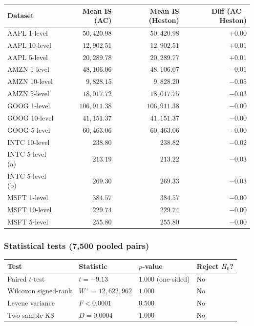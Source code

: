 \documentclass[11pt]{article}
\begin{document}
\begin{center}
\small
\begin{tabular}{lrrr}
\toprule
Dataset & Mean IS (AC) & Mean IS (Heston) & Diff (AC$-$Heston) \\
\midrule
AAPL 1-level  & $50{,}420.98$ & $50{,}420.98$ & $+0.00$ \\
AAPL 10-level & $12{,}902.51$ & $12{,}902.51$ & $+0.01$ \\
AAPL 5-level  & $20{,}289.78$ & $20{,}289.77$ & $+0.01$ \\
AMZN 1-level  & $48{,}106.06$ & $48{,}106.07$ & $-0.01$ \\
AMZN 10-level & $\phantom{0}9{,}828.15$ & $\phantom{0}9{,}828.20$ & $-0.05$ \\
AMZN 5-level  & $18{,}017.72$ & $18{,}017.75$ & $-0.03$ \\
GOOG 1-level  & $106{,}911.38$ & $106{,}911.38$ & $-0.00$ \\
GOOG 10-level & $41{,}151.37$ & $41{,}151.37$ & $-0.00$ \\
GOOG 5-level  & $60{,}463.06$ & $60{,}463.06$ & $-0.00$ \\
INTC 10-level & $\phantom{000}238.80$ & $\phantom{000}238.82$ & $-0.02$ \\
INTC 5-level (a) & $\phantom{000}213.19$ & $\phantom{000}213.22$ & $-0.03$ \\
INTC 5-level (b) & $\phantom{000}269.30$ & $\phantom{000}269.33$ & $-0.03$ \\
MSFT 1-level  & $\phantom{000}384.57$ & $\phantom{000}384.57$ & $-0.00$ \\
MSFT 10-level & $\phantom{000}229.74$ & $\phantom{000}229.74$ & $-0.00$ \\
MSFT 5-level  & $\phantom{000}255.80$ & $\phantom{000}255.80$ & $-0.00$ \\
\bottomrule
\end{tabular}
\end{center}

\subsubsection*{Statistical tests (7,500 pooled pairs)}

\begin{center}
\begin{tabular}{llll}
\toprule
Test & Statistic & $p$-value & Reject $H_0$? \\
\midrule
Paired $t$-test     & $t = -9.13$                & $1.000$ (one-sided) & No \\
Wilcoxon signed-rank & $W^+ = 12{,}622{,}962$    & $1.000$             & No \\
Levene variance      & $F < 0.0001$               & $0.500$             & No \\
Two-sample KS        & $D = 0.0004$               & $1.000$             & No \\
\bottomrule
\end{tabular}
\end{center}
\end{document}
